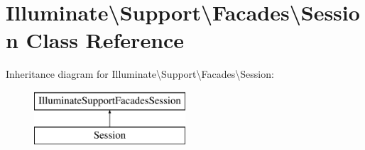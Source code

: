 \hypertarget{class_illuminate_1_1_support_1_1_facades_1_1_session}{}\section{Illuminate\textbackslash{}Support\textbackslash{}Facades\textbackslash{}Session Class Reference}
\label{class_illuminate_1_1_support_1_1_facades_1_1_session}
Inheritance diagram for Illuminate\textbackslash{}Support\textbackslash{}Facades\textbackslash{}Session\+:\begin{figure}[H]
\begin{center}
\leavevmode
\includegraphics[height=2.000000cm]{class_illuminate_1_1_support_1_1_facades_1_1_session}
\end{center}
\end{figure}
